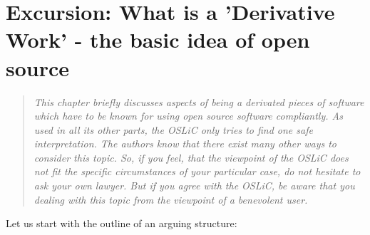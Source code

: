 %
%
%
%
%



\section{Excursion: What is a 'Derivative Work' - the basic idea of open source}
\footnotesize \begin{quote}\itshape This chapter briefly discusses aspects of
being a derivated pieces of software which have to be known for using open
source software compliantly. As used in all its other parts, the OSLiC
only tries to find one safe interpretation. The authors know that there
exist many other ways to consider this topic. So, if you feel, that the
viewpoint of the OSLiC does not fit the specific circumstances of your
particular case, do not hesitate to ask your own lawyer. But if you agree with
the OSLiC, be aware that you dealing with this topic from the viewpoint of a
benevolent user.
\end{quote}
\normalsize
Let us start with the outline of an arguing structure:

